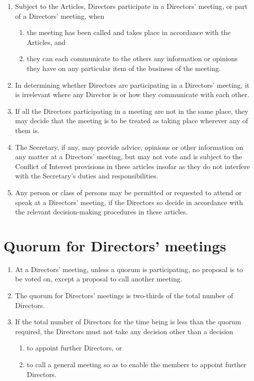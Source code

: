 \documentclass[a4paper,12pt]{article}
\begin{document}
\begin{enumerate}
  \item Subject to the Articles, Directors participate in a Directors' meeting, or part of a Directors' meeting, when
  \begin{enumerate}
    \item the meeting has been called and takes place in accordance with the Articles, and
    \item they can each communicate to the others any information or opinions they have on any particular item of the business of the meeting.
  \end{enumerate}
  \item In determining whether Directors are participating in a Directors' meeting, it is irrelevant where any Director is or how they communicate with each other.
  \item If all the Directors participating in a meeting are not in the same place, they may decide that the meeting is to be treated as taking place wherever any of them is.
  \item The Secretary, if any, may provide advice, opinions or other information on any matter at a Directors' meeting, but may not vote and is subject to the Conflict of Interest provisions in these articles insofar as they do not interfere with the Secretary's duties and responsibilities. %
  \item Any person or class of persons may be permitted or requested to attend or speak at a Directors' meeting, if the Directors so decide in accordance with the relevant decision-making procedures in these articles. %
\end{enumerate}

\section{Quorum for Directors' meetings}

\begin{enumerate}
  \item At a Directors' meeting, unless a quorum is participating, no proposal is to be voted on, except a proposal to call another meeting.
  \item The quorum for Directors' meetings is two-thirds of the total number of Directors. %
  \item If the total number of Directors for the time being is less than the quorum required, the Directors must not take any decision other than a decision
  \begin{enumerate}
    \item to appoint further Directors, or
    \item to call a general meeting so as to enable the members to appoint further Directors.
  \end{enumerate}
\end{enumerate}
\end{document}
